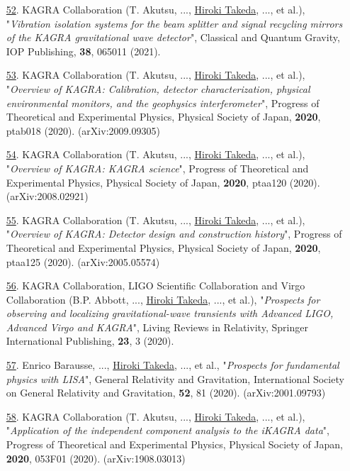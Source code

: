 \documentclass[uplatex, 12pt]{article}
\begin{document}
\begin{enumerate}
\item[\uline{52}.] KAGRA Collaboration (T. Akutsu, ..., \uline{Hiroki Takeda}, ..., et al.),
"\emph{Vibration isolation systems for the beam splitter and signal recycling mirrors of the KAGRA gravitational wave detector}",
Classical and Quantum Gravity, IOP Publishing, {\bf 38}, 065011 (2021).\\

\item[\uline{53}.] KAGRA Collaboration (T. Akutsu, ..., \uline{Hiroki Takeda}, ..., et al.), "\emph{Overview of KAGRA: Calibration, detector characterization, physical environmental monitors, and the geophysics interferometer}", Progress of Theoretical and Experimental Physics, Physical Society of Japan, {\bf 2020}, ptab018 (2020). (arXiv:2009.09305)\\

\item[\uline{54}.] KAGRA Collaboration (T. Akutsu, ..., \uline{Hiroki Takeda}, ..., et al.), "\emph{Overview of KAGRA: KAGRA science}", Progress of Theoretical and Experimental Physics, Physical Society of Japan, {\bf 2020}, ptaa120 (2020). (arXiv:2008.02921)\\

\item[\uline{55}.] KAGRA Collaboration (T. Akutsu, ..., \uline{Hiroki Takeda}, ..., et al.), "\emph{Overview of KAGRA: Detector design and construction history}", Progress of Theoretical and Experimental Physics, Physical Society of Japan, {\bf 2020}, ptaa125 (2020). (arXiv:2005.05574)\\

\item[\uline{56}.] KAGRA Collaboration, LIGO Scientific Collaboration and Virgo Collaboration (B.P. Abbott, ..., \uline{Hiroki Takeda}, ..., et al.), "\emph{Prospects for observing and localizing gravitational-wave transients with Advanced LIGO, Advanced Virgo and KAGRA}", Living Reviews in Relativity, Springer International Publishing, {\bf 23}, 3 (2020).\\

\item[\uline{57}.] Enrico Barausse, ..., \uline{Hiroki Takeda}, ..., et al., "\emph{Prospects for fundamental physics with LISA}", General Relativity and Gravitation, International Society on General Relativity and Gravitation, {\bf 52}, 81 (2020). (arXiv:2001.09793)\\

\item[\uline{58}.] KAGRA Collaboration (T. Akutsu, ..., \uline{Hiroki Takeda}, ..., et al.), "\emph{Application of the independent component analysis to the iKAGRA data}", Progress of Theoretical and Experimental Physics, Physical Society of Japan, {\bf 2020}, 053F01 (2020). (arXiv:1908.03013)\\


\end{enumerate}
\end{document}
